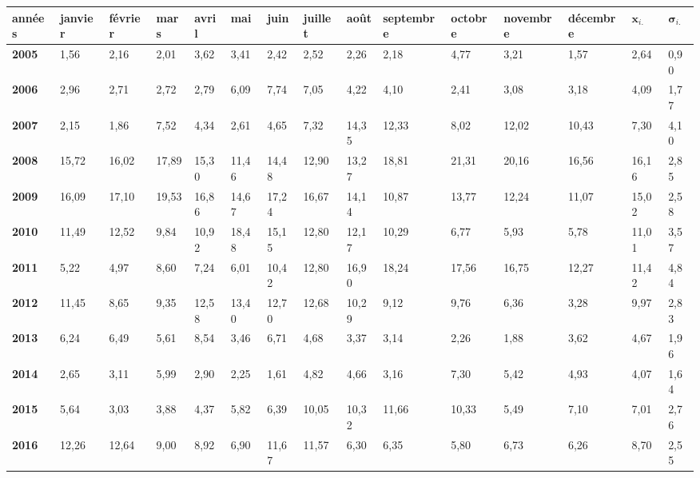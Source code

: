 \renewcommand{\arraystretch}{1.3} %
\begin{tabular}{|l|l|l|l|l|l|l|l|l|l|l|l|l|l|l|}
    \hline
    \textbf{années} & \textbf{janvier} & \textbf{février} & \textbf{mars} & \textbf{avril} & \textbf{mai} & \textbf{juin} & \textbf{juillet} & \textbf{août} & \textbf{septembre} & \textbf{octobre} & \textbf{novembre} & \textbf{décembre}& \textbf{$\bm{x}_{i.}$} & \textbf{$\bm{\sigma}_{i.}$} \\ \hline
    \textbf{2005} & \hspace{3pt}1,56 & 2,16 & 2,01 & 3,62 & 3,41 & 2,42 & 2,52 & 2,26 & 2,18 & 4,77 & 3,21 & 1,57 & 2,64 & 0,90 \\ \hline
    \textbf{2006} & 2,96 & 2,71 & 2,72 & 2,79 & 6,09 & 7,74 & 7,05 & 4,22 & 4,10 & 2,41 & 3,08 & 3,18 & 4,09 & 1,77 \\ \hline
    \textbf{2007} & 2,15 & 1,86 & 7,52 & 4,34 & 2,61 & 4,65 & 7,32 & 14,35 & 12,33 & 8,02 & 12,02 & 10,43 & 7,30 & 4,10 \\ \hline
    \textbf{2008} & 15,72 & 16,02 & 17,89 & 15,30 & 11,46 & 14,48 & 12,90 & 13,27 & 18,81 & 21,31 & 20,16 & 16,56 & 16,16 & 2,85 \\ \hline
    \textbf{2009} & 16,09 & 17,10 & 19,53 & 16,86 & 14,67 & 17,24 & 16,67 & 14,14 & 10,87 & 13,77 & 12,24 & 11,07 & 15,02 & 2,58 \\ \hline
    \textbf{2010} & 11,49 & 12,52 & 9,84 & 10,92 & 18,48 & 15,15 & 12,80 & 12,17 & 10,29 & 6,77 & 5,93 & 5,78 & 11,01 & 3,57 \\ \hline
    \textbf{2011} & 5,22 & 4,97 & 8,60 & 7,24 & 6,01 & 10,42 & 12,80 & 16,90 & 18,24 & 17,56 & 16,75 & 12,27 & 11,42 & 4,84 \\ \hline
    \textbf{2012} & 11,45 & 8,65 & 9,35 & 12,58 & 13,40 & 12,70 & 12,68 & 10,29 & 9,12 & 9,76 & 6,36 & 3,28 & 9,97 & 2,83 \\ \hline
    \textbf{2013} & 6,24 & 6,49 & 5,61 & 8,54 & 3,46 & 6,71 & 4,68 & 3,37 & 3,14 & 2,26 & 1,88 & 3,62 & 4,67 & 1,96 \\ \hline
    \textbf{2014} & 2,65 & 3,11 & 5,99 & 2,90 & 2,25 & 1,61 & 4,82 & 4,66 & 3,16 & 7,30 & 5,42 & 4,93 & 4,07 & 1,64 \\ \hline
    \textbf{2015} & 5,64 & 3,03 & 3,88 & 4,37 & 5,82 & 6,39 & 10,05 & 10,32 & 11,66 & 10,33 & 5,49 & 7,10 & 7,01 & 2,76 \\ \hline
    \textbf{2016} & 12,26 & 12,64 & 9,00 & 8,92 & 6,90 & 11,67 & 11,57 & 6,30 & 6,35 & 5,80 & 6,73 & 6,26 & 8,70 & 2,55 \\ \hline

\end{tabular}
